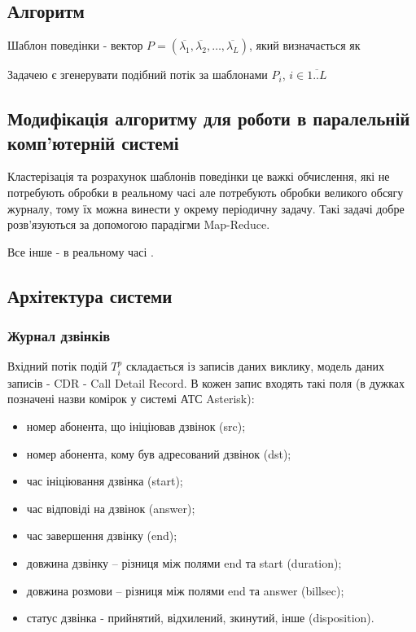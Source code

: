     \subsection{Алгоритм}

  Шаблон поведінки - вектор
  $P = (\overline{\lambda_1}, \overline{\lambda_2}, \dots, \overline{\lambda_L})$,
  який визначається як 

Задачею є згенерувати подібний потік за шаблонами $P_i$, $i \in \overline{1..L} $

	\subsection{Модифікація алгоритму для роботи в паралельній комп'ютерній системі}

	Кластерізація та розрахунок шаблонів поведінки це важкі обчислення, які не потребують обробки в реальному часі але потребують обробки великого обсягу журналу, тому їх можна винести у окрему періодичну задачу. Такі задачі добре розв'язуються за допомогою парадігми Map-Reduce.

	Все інше - в реальному часі \TBD.

\subsection{Архітектура системи}

\subsubsection{Журнал дзвінків}
  Вхідний потік подій ${T_i^p}$ складається із записів даних виклику, модель 
  даних записів - CDR - Call Detail Record. В кожен запис входять такі поля (в 
  дужках позначені назви комірок у системі АТС Asterisk):

   \begin{itemize}
    \item номер абонента, що ініціював дзвінок (src);
    \item номер абонента, кому був адресований дзвінок (dst);
    \item час ініціювання дзвінка (start);
    \item час відповіді на дзвінок (answer);
    \item час завершення дзвінку (end);
    \item довжина дзвінку -- різниця між полями end та start (duration);
    \item довжина розмови -- різниця між полями end та answer (billsec);
    \item статус дзвінка - прийнятий, відхилений, зкинутий, інше (disposition).
  \end{itemize}

